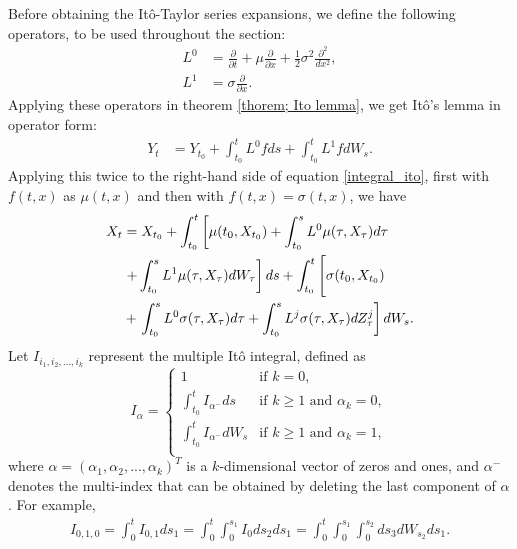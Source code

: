 Before obtaining the Itô-Taylor series expansions, we define the following operators, to be used throughout the section:
\begin{align}
L^0&=\frac{\partial}{\partial t}
+\mu\frac{\partial}{\partial x}+\frac{1}{2}\sigma^2\frac{\partial^2}{dx^2},\\
L^1&=\sigma\frac{\partial}{\partial x}.
\end{align} 
Applying these operators in theorem \ref{thorem; Ito lemma}, we get Itô's lemma in operator form:
\begin{align}\label{ItoMultidimOperForm}
Y_t&=Y_{t_0}+\int_{t_0}^{t}L^0fds+\int_{t_0}^{t}L^1fdW_s.
\end{align}
Applying this twice to the right-hand side of equation \eqref{integral_ito},  first with $f(t,x)$ as $\mu(t,x)$ and then with $f(t,x)=\sigma(t,x)$, we have
\begin{align}
X_t&=X_{t_0}+\int_{t_0}^{t}
\left[
\mu(t_0,X_{t_0})+\int_{t_0}^{s}L^0\mu(\tau,X_\tau)d\tau \right.\notag\\
&	\left.+\int_{t_0}^{s}L^1\mu(\tau,X_\tau)dW_\tau
\right]ds
+\int_{t_0}^{t}\Bigg[ \sigma(t_0,X_{t_0})   \Bigg.\notag\\
&+\left.
\int_{t_0}^{s}L^0 \sigma(\tau,X_\tau)d\tau
+\int_{t_0}^{s}L^j\sigma(\tau,X_\tau)dZ_\tau^j
\right]dW_s.
\end{align}
Let $I_{i_1,i_2,...,i_k}$ represent the multiple It\^o integral, defined as
\[  I_\alpha = \left\{
\begin{array}{ll}\label{multiple_ito_integral}
1 & \text{if } k=0, \\
\int_{t_0}^{t}I_{\alpha^-} ds & \text{if } k\geq 1 \text{ and } \alpha_k=0,\\
\int_{t_0}^{t}I_{\alpha^-} dW_s & \text{if } k\geq 1 \text{ and } \alpha_k= 1,\\
\end{array} 
\right. \]
where $\alpha = (\alpha_1,\alpha_2,...,\alpha_k)^T$ is a $k$-dimensional vector of zeros and ones, and  $\alpha^-$ denotes the multi-index that can be obtained by deleting the last component of $\alpha$. For example,
\begin{align}
I_{0,1,0}=\int_{0}^{t}I_{0,1} ds_1 = \int_{0}^{t}\int_0^{s_1}I_{0}   ds_2ds_1    =\int_{0}^{t}\int_0^{s_1}\int_0^{s_2}ds_3dW_{s_2}ds_1.
\end{align}

